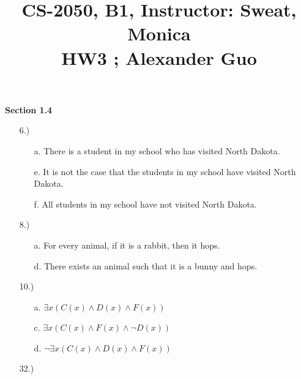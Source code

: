 \documentclass{article}
\title{\large{\vspace{-1.0cm}CS-2050, B1, Instructor: Sweat, Monica \\ HW3 ; Alexander Guo}}
\date{}
\begin{document}
\maketitle

\vspace{-1.5cm}

\textbf{Section 1.4}

\begin{enumerate}

\item[6.)]

\begin{enumerate}

\item[a.] There is a student in my school who has visited North Dakota.

\item[e.] It is not the case that the students in my school have visited North Dakota.

\item[f.] All students in my school have not visited North Dakota.

\end{enumerate}

\item[8.)]

\begin{enumerate}

\item[a.] For every animal, if it is a rabbit, then it hops.

\item[d.] There exists an animal such that it is a bunny and hops.

\end{enumerate}

\item[10.)]

\begin{enumerate}

\item[a.] $\exists x ( C(x) \wedge D(x) \wedge F(x) )$

\item[c.] $\exists x ( C(x) \wedge F(x) \wedge \neg D(x) )$

\item[d.] $\neg \exists x ( C(x) \wedge D(x) \wedge F(x) )$

\end{enumerate}

\item[32.)]


\end{enumerate}
\end{document}
